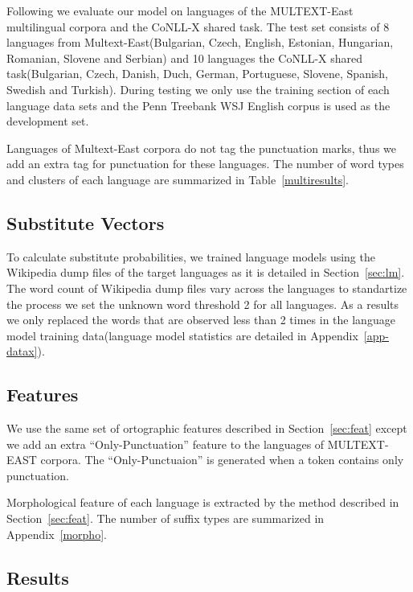 Following \cite{christodoulopoulos-goldwater-steedman:2011:EMNLP} we
evaluate our model on languages of the MULTEXT-East\cite{Multext}
multilingual corpora and the CoNLL-X\cite{conll} shared task.  The
test set consists of 8 languages from Multext-East(Bulgarian, Czech,
English, Estonian, Hungarian, Romanian, Slovene and Serbian) and 10
languages the CoNLL-X shared task(Bulgarian, Czech, Danish, Duch,
German, Portuguese, Slovene, Spanish, Swedish and Turkish).  During
testing we only use the training section of each language data sets
\cite{Lee:2010:STU:1870658.1870741} and the Penn Treebank WSJ English
corpus is used as the development set.

Languages of Multext-East corpora do not tag the punctuation marks,
thus we add an extra tag for punctuation for these languages.  The
number of word types and clusters of each language are summarized in
Table~\ref{multiresults}.

\subsection{Substitute Vectors}
To calculate substitute probabilities, we trained language models
using the Wikipedia dump files \cite{wikipedia} of the target
languages as it is detailed in Section~\ref{sec:lm}.  The word count
of Wikipedia dump files vary across the languages to standartize the
process we set the unknown word threshold 2 for all languages.  As a
results we only replaced the words that are observed less than 2 times
in the language model training data(language model statistics are
detailed in Appendix~\ref{app-datax}).

\subsection{Features}
We use the same set of ortographic features described in
Section~\ref{sec:feat} except we add an extra ``Only-Punctuation''
feature to the languages of MULTEXT-EAST corpora.  The
``Only-Punctuaion'' is generated when a token contains only
punctuation.  

Morphological feature of each language is extracted by the method
described in Section~\ref{sec:feat}.  The number of suffix types are
summarized in Appendix~\ref{morpho}.

\subsection{Results}

